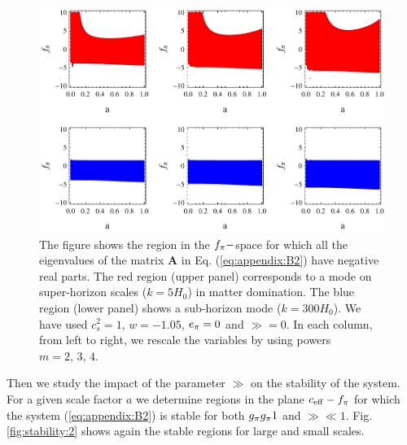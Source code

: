 \begin{figure}[tb]
\centering
\includegraphics[width=\textwidth]{figures/chapter-ade/stability.pdf} 
\caption{The figure shows the region in the $ \ff-$space for which all the eigenvalues of the matrix $ \mathbf{A} $ in Eq. (\ref{eq:appendix:B2}) have negative real parts. The red region (upper panel) corresponds to a mode on super-horizon scales ($k=5 H_0$) in matter domination. The blue region (lower panel) shows a sub-horizon mode  ($ k=300 H_0 $). We have used $c_s^2 = 1$, $w=-1.05$, $\aa=0$ and $\gg=0$. In each column, from left to right, we rescale the variables by using powers $ m=2,\,3,\,4 $.}
\label{fig:stability}
\end{figure}

Then we study the impact of the parameter $ \gg $ on the stability of the system. For a given scale factor $ a $ we determine regions in the plane $ \ceff-\ff $ for which the system (\ref{eq:appendix:B2}) is stable for both $ \gg \mug 1 $ and $ \gg \ll 1 $. Fig. \ref{fig:stability:2} shows again the stable regions for large and small scales. 

